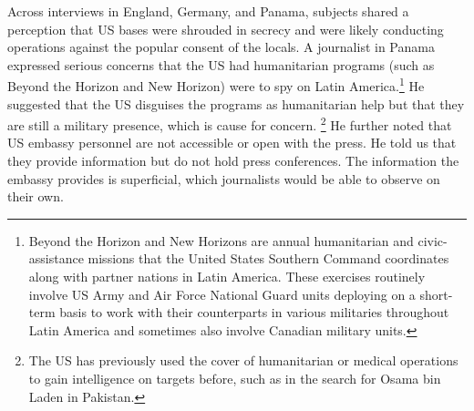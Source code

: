Across interviews in England, Germany, and Panama, subjects shared a perception that US bases were shrouded in secrecy and were likely conducting operations against the popular consent of the locals. A journalist in Panama expressed serious concerns that the US had humanitarian programs (such as Beyond the Horizon and New Horizon) were to spy on Latin America.\footnote{Beyond the Horizon and New Horizons are annual humanitarian and civic-assistance missions that the United States Southern Command coordinates along with partner nations in Latin America. These exercises routinely involve US Army and Air Force National Guard units deploying on a short-term basis to work with their counterparts in various militaries throughout Latin America and sometimes also involve Canadian military units.}  He suggested that the US disguises the programs as humanitarian help but that they are still a military presence, which is cause for concern. \footnote{The US has previously used the cover of humanitarian or medical operations to gain intelligence on targets before, such as in the search for Osama bin Laden in Pakistan.} He further noted that US embassy personnel are not accessible or open with the press.  He told us that they provide information but do not hold press conferences. The information the embassy provides is superficial, which journalists would be able to observe on their own.\autocite{journ20180713}


